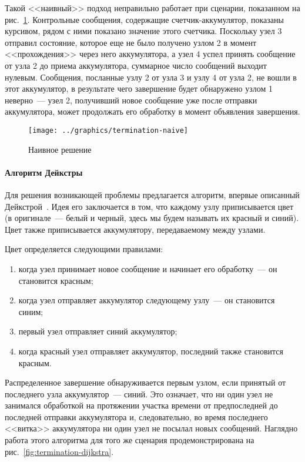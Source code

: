 Такой <<наивный>> подход неправильно работает при сценарии, показанном на
рис.~\ref{fig:termination-naive}. Контрольные сообщения, содержащие счетчик-аккумулятор,
показаны курсивом, рядом с ними показано значение этого счетчика. Поскольку узел 3
отправил состояние, которое еще не было получено узлом 2 в момент <<прохождения>> через
него аккумулятора, а узел 4 успел принять сообщение от узла 2 до приема аккумулятора,
суммарное число сообщений выходит нулевым. Сообщения, посланные узлу 2 от узла 3 и узлу 4
от узла 2, не вошли в этот аккумулятор, в результате чего завершение будет обнаружено
узлом 1 неверно~--- узел 2, получивший новое сообщение уже после отправки аккумулятора,
может продолжать его обработку в момент объявления завершения.

\begin{figure}[htb]
  \centering
  \texttt{[image: ../graphics/termination-naive]}  
  \caption{Наивное решение}
\label{fig:termination-naive}
\end{figure}

\paragraph{Алгоритм Дейкстры}
\label{sec:distr-term-dijkstra}

Для решения возникающей проблемы предлагается алгоритм, впервые описанный
Дейкстрой~\cite{DistrTerm}. Идея его заключается в том, что каждому узлу приписывается
цвет (в оригинале~--- белый и черный, здесь мы будем называть их красный и синий). Цвет
также приписывается аккумулятору, передаваемому между узлами.

Цвет определяется следующими правилами:
\begin{enumerate}
\item когда узел принимает новое сообщение и начинает его обработку~--- он становится красным;
\item когда узел отправляет аккумулятор следующему узлу~--- он становится синим;
\item первый узел отправляет синий аккумулятор;
\item когда красный узел отправляет аккумулятор, последний также становится красным.
\end{enumerate}

Распределенное завершение обнаруживается первым узлом, если принятый от последнего узла
аккумулятор~--- синий. Это означает, что ни один узел не занимался обработкой на
протяжении участка времени от предпоследней до последней отправки аккумулятора и,
следовательно, во время последнего <<витка>> аккумулятора ни один узел не посылал новых
сообщений. Наглядно работа этого алгоритма для того же сценария продемонстрирована на
рис.~\ref{fig:termination-dijkstra}.

